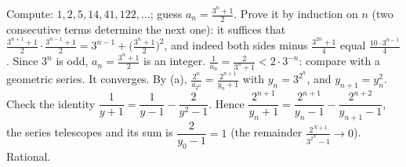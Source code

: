 \documentclass[11pt,a4paper]{article}
\begin{document}
 Compute: $1,2,5,14,41,122,\dots$; guess $a_n=\frac{3^n+1}2$.
 Prove it by induction on $n$ (two consecutive terms determine the next one): it suffices that $\frac{3^{n+1}+1}2\cdot\frac{3^{n-1}+1}2=3^{n-1}+\bigl(\frac{3^n+1}2\bigr)^2$, and indeed both sides minus $\frac{3^{2n}+1}{4}$ equal $\frac{10\cdot3^{n-1}}4$. Since $3^n$ is odd, $a_n=\frac{3^n+1}2$ is an integer.
 $\frac1{a_n}=\frac2{3^n+1}<2\cdot3^{-n}$: compare with a geometric series. It converges.
 By (a), $\frac{2^n}{a_{2^n}}=\frac{2^{n+1}}{y_n+1}$ with $y_n=3^{2^n}$, and $y_{n+1}=y_n^2$. Check the identity $\dfrac1{y+1}=\dfrac1{y-1}-\dfrac2{y^2-1}$.
 Hence $\dfrac{2^{n+1}}{y_n+1}=\dfrac{2^{n+1}}{y_n-1}-\dfrac{2^{n+2}}{y_{n+1}-1}$, the series telescopes and its sum is $\dfrac{2}{y_0-1}=1$ (the remainder $\frac{2^{N+1}}{3^{2^N}-1}\to0$). Rational.
\end{document}
